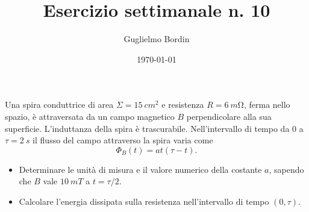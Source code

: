 \documentclass[10pt]{gulartcl}
\title{Esercizio settimanale n. 10}
\author{Guglielmo Bordin}
\date{\today}
\begin{document}
\maketitle 

\noindent
Una spira conduttrice di area $\Sigma = \qty{15}{cm^2}$ e resistenza
$R = \qty{6}{m\ohm}$, ferma nello spazio, è attraversata da un campo
magnetico $B$ perpendicolare alla sua superficie. L’induttanza della spira
è trascurabile. Nell’intervallo di tempo da $0$ a $\tau = \qty{2}{s}$ il
flusso del campo attraverso la spira varia come
\[
     \Phi_{B}(t) = a t (\tau - t).
 \]
\begin{itemize}
    \item Determinare le unità di misura e il valore numerico della
        costante $a$, sapendo che $B$ vale $\qty{10}{mT}$ a $t = \tau / 2$.
    \item Calcolare l’energia dissipata sulla resistenza nell’intervallo di
        tempo $(0, \tau)$.
\end{itemize} 
\end{document}
